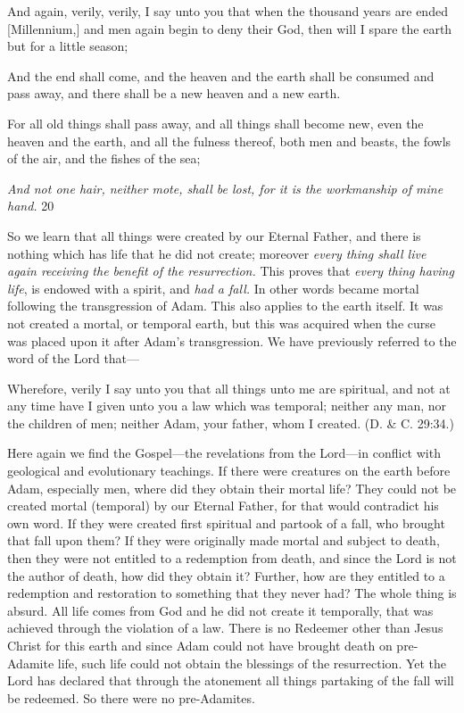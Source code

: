 And again, verily, verily, I say unto you that when the thousand years are ended
[Millennium,] and men again begin to deny their God, then will I spare the earth but for a
little season;

And the end shall come, and the heaven and the earth shall be consumed and pass away, and
there shall be a new heaven and a new earth.

For all old things shall pass away, and all things shall become new, even the heaven and the
earth, and all the fulness thereof, both men and beasts, the fowls of the air, and the fishes of
the sea;

\textit{And not one hair, neither mote, shall be lost, for it is the workmanship of mine hand.} 20

So we learn that all things were created by our Eternal Father, and there is nothing which has
life that he did not create; moreover \textit{every thing shall live again receiving the benefit of the
resurrection.} This proves that \textit{every thing having life}, is endowed with a spirit, and \textit{had a fall.}
In other words became mortal following the transgression of Adam. This also applies to the
earth itself. It was not created a mortal, or temporal earth, but this was acquired when the
curse was placed upon it after Adam's transgression. We have previously referred to the word
of the Lord that—

Wherefore, verily I say unto you that all things unto me are spiritual, and not at any time
have I given unto you a law which was temporal; neither any man, nor the children of men;
neither Adam, your father, whom I created. (D. \& C. 29:34.)

Here again we find the Gospel—the revelations from the Lord—in conflict with geological
and evolutionary teachings. If there were creatures on the earth before Adam, especially men,
where did they obtain their mortal life? They could not be created mortal (temporal) by our
Eternal Father, for that would contradict his own word. If they were created first spiritual and
partook of a fall, who brought that fall upon them? If they were originally made mortal and
subject to death, then they were not entitled to a redemption from death, and since the Lord is
not the author of death, how did they obtain it? Further, how are they entitled to a redemption
and restoration to something that they never had? The whole thing is absurd. All life comes
from God and he did not create it temporally, that was achieved through the violation of a
law. There is no Redeemer other than Jesus Christ for this earth and since Adam could not
have brought death on pre-Adamite life, such life could not obtain the blessings of the
resurrection. Yet the Lord has declared that through the atonement all things partaking of the
fall will be redeemed. So there were no pre-Adamites.

